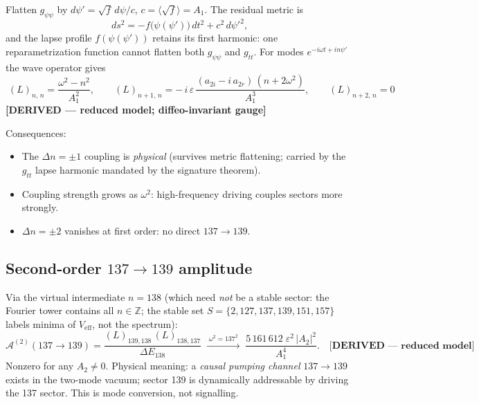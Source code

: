 Flatten $g_{\psi\psi}$ by $d\psi' = \sqrt{f}\,d\psi / c$, $c = \langle\sqrt{f}\rangle = A_1$.
The residual metric is
\begin{equation}
  ds^2 = -f\bigl(\psi(\psi')\bigr)\,dt^2 + c^2\,d\psi'^2 ,
\end{equation}
and the lapse profile $f(\psi(\psi'))$ retains its first harmonic: one reparametrization
function cannot flatten both $g_{\psi\psi}$ and $g_{tt}$. For modes
$e^{-i\omega t + in\psi'}$ the wave operator gives
\begin{equation}
  \boxed{\;
  (L)_{n,\,n} = \frac{\omega^2 - n^2}{A_1^2},\qquad
  (L)_{n+1,\,n} = -\,i\,\varepsilon\,\frac{(a_{2i} - i\,a_{2r})\,(n + 2\omega^2)}{A_1^3},\qquad
  (L)_{n+2,\,n} = 0 \;}
  \label{eq:bridge_invariant}
\end{equation}
\textbf{[DERIVED — reduced model; diffeo-invariant gauge]}

\noindent Consequences:
\begin{itemize}
  \item The $\Delta n = \pm1$ coupling is \emph{physical} (survives metric flattening;
        carried by the $g_{tt}$ lapse harmonic mandated by the signature theorem).
  \item Coupling strength grows as $\omega^2$: high-frequency driving couples
        sectors more strongly.
  \item $\Delta n = \pm2$ vanishes at first order: no direct $137\to139$.
\end{itemize}

\subsection{Second-order $137 \to 139$ amplitude}
\label{sec:bridge_second_order}

Via the virtual intermediate $n = 138$ (which need \emph{not} be a stable sector:
the Fourier tower contains all $n \in \mathbb{Z}$; the stable set
$S = \{2,127,137,139,151,157\}$ labels minima of $V_{\mathrm{eff}}$, not the spectrum):
\begin{equation}
  \mathcal{A}^{(2)}(137\to139)
  = \frac{(L)_{139,138}\,(L)_{138,137}}{\Delta E_{138}}
  \;\xrightarrow{\;\omega^2 = 137^2\;}\;
  \frac{5\,161\,612\;\varepsilon^2\,|A_2|^2}{A_1^4}.
  \quad\textbf{[DERIVED — reduced model]}
\end{equation}
Nonzero for any $A_2 \neq 0$. Physical meaning: a \emph{causal pumping channel}
$137 \to 139$ exists in the two-mode vacuum; sector 139 is dynamically addressable
by driving the 137 sector. This is mode conversion, not signalling.

